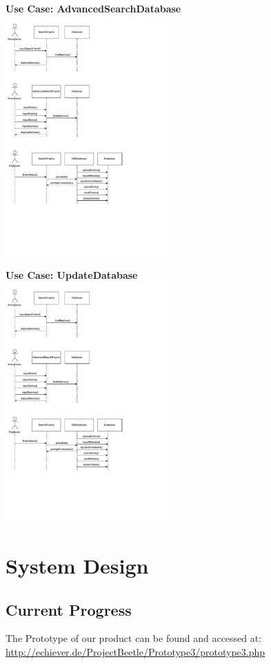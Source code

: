 \documentclass[12pt,a4paper]{article}
\begin{document}
{\bf Use Case: AdvancedSearchDatabase}\\

\includegraphics[height=92mm]{Sequence2.pdf}

{\bf Use Case: UpdateDatabase}\\

\includegraphics[height=92mm]{Sequence3.pdf}

\newpage

\section{System Design}
\subsection{Current Progress}

The Prototype of our product can be found and accessed at: \url{http://echiever.de/ProjectBeetle/Prototype3/prototype3.php}
\end{document}
